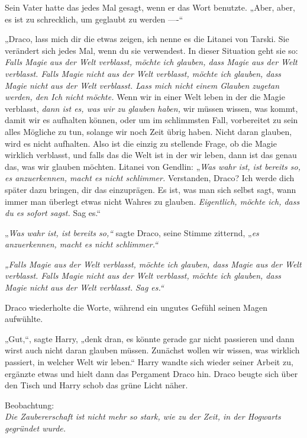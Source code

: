 {Sein Vater hatte das jedes Mal gesagt, wenn er das Wort benutzte. „Aber, aber, es ist zu schrecklich, um geglaubt zu werden ----“

„Draco, lass mich dir die etwas zeigen, ich nenne es die Litanei von Tarski. Sie verändert sich jedes Mal, wenn du sie verwendest. In dieser Situation geht sie so: \emph{Falls Magie aus der Welt verblasst, möchte ich glauben, dass Magie aus der Welt verblasst. Falls Magie nicht aus der Welt verblasst, möchte ich glauben, dass Magie nicht aus der Welt verblasst. Lass mich nicht einem Glauben zugetan werden, den Ich nicht möchte.} Wenn wir in einer Welt leben in der die Magie verblasst, \emph{dann ist es, was wir zu glauben haben,} wir müssen wissen, was kommt, damit wir es aufhalten können, oder um im schlimmsten Fall, vorbereitet zu sein alles Mögliche zu tun, solange wir noch Zeit übrig haben. Nicht daran glauben, wird es nicht aufhalten. Also ist die einzig zu stellende Frage, ob die Magie wirklich verblasst, und falls das die Welt ist in der wir leben, dann ist das genau das, was wir glauben möchten. Litanei von Gendlin: „\emph{Was wahr ist, ist bereits so, es anzuerkennen, macht es nicht schlimmer.} Verstanden, Draco? Ich werde dich später dazu bringen, dir das einzuprägen. Es ist, was man sich selbst sagt, wann immer man überlegt etwas nicht Wahres zu glauben. \emph{Eigentlich, möchte ich, dass du es sofort sagst.} Sag es.“

„\emph{Was wahr ist, ist bereits so,“} sagte Draco, seine Stimme zitternd, „\emph{es anzuerkennen, macht es nicht schlimmer.“}

\emph{„Falls Magie aus der Welt verblasst, möchte ich glauben, dass Magie aus der Welt verblasst. Falls Magie nicht aus der Welt verblasst, möchte ich glauben, dass Magie nicht aus der Welt verblasst.} \emph{Sag es.“}

Draco wiederholte die Worte, während ein ungutes Gefühl seinen Magen aufwühlte.

„Gut,“, sagte Harry, „denk dran, es könnte gerade gar nicht passieren und dann wirst auch nicht daran glauben müssen. Zunächst wollen wir wissen, was wirklich passiert, in welcher Welt wir leben.“ Harry wandte sich wieder seiner Arbeit zu, ergänzte etwas und hielt dann das Pergament Draco hin. Draco beugte sich über den Tisch und Harry schob das grüne Licht näher.

Beobachtung:\\ \emph{Die Zaubererschaft ist nicht mehr so stark, wie zu der Zeit, in der Hogwarts gegründet wurde.}\\

}
